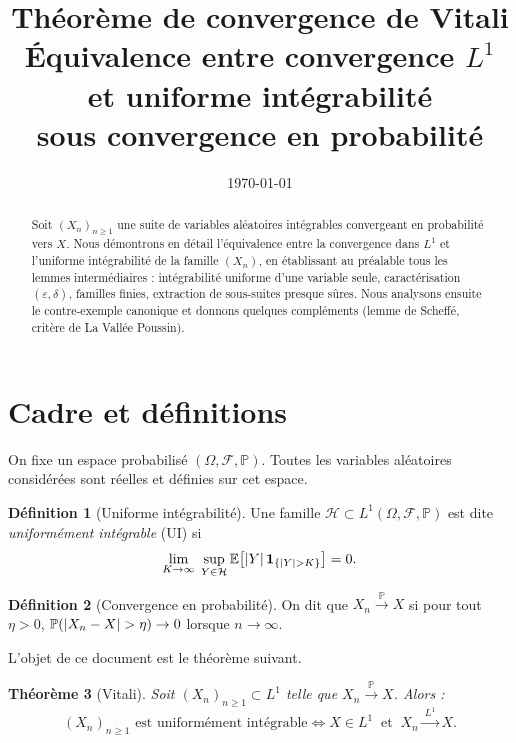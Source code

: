\documentclass[11pt,a4paper]{article}
\title{Théorème de convergence de Vitali\\[0.3em]
\large Équivalence entre convergence $L^1$ et uniforme intégrabilité\\
sous convergence en probabilité}
\author{}
\date{\today}
\newtheorem{theorem}{Théorème}[section]
\theoremstyle{definition}
\newtheorem{definition}[theorem]{Définition}
\theoremstyle{remark}
\newcommand{\E}{\mathbb{E}}
\newcommand{\PP}{\mathbb{P}}
\newcommand{\F}{\mathcal{F}}
\newcommand{\Hf}{\mathcal{H}}
\newcommand{\ind}[1]{\mathbf{1}_{#1}}
\newcommand{\convP}{\xrightarrow{\ \PP\ }}
\newcommand{\convLone}{\xrightarrow{\ L^1\ }}
\DeclarePairedDelimiter{\abs}{\lvert}{\rvert}
\begin{document}
\maketitle

\begin{abstract}
Soit $(X_n)_{n\ge 1}$ une suite de variables aléatoires intégrables convergeant en
probabilité vers $X$. Nous démontrons en détail l'équivalence entre la convergence
dans $L^1$ et l'uniforme intégrabilité de la famille $(X_n)$, en établissant au
préalable tous les lemmes intermédiaires : intégrabilité uniforme d'une variable
seule, caractérisation $(\varepsilon,\delta)$, familles finies, extraction de
sous-suites presque sûres. Nous analysons ensuite le contre-exemple canonique et
donnons quelques compléments (lemme de Scheffé, critère de La Vallée Poussin).
\end{abstract}

\tableofcontents

\section{Cadre et définitions}

On fixe un espace probabilisé $(\Omega, \F, \PP)$. Toutes les variables aléatoires
considérées sont réelles et définies sur cet espace.

\begin{definition}[Uniforme intégrabilité]\label{def:UI}
Une famille $\Hf \subset L^1(\Omega,\F,\PP)$ est dite \emph{uniformément intégrable}
(UI) si
\[
\lim_{K \to \infty} \; \sup_{Y \in \Hf} \E\big[\abs{Y}\,\ind{\{\abs{Y} > K\}}\big] = 0.
\]
\end{definition}

\begin{definition}[Convergence en probabilité]
On dit que $X_n \convP X$ si pour tout $\eta > 0$,
$\PP(\abs{X_n - X} > \eta) \to 0$ lorsque $n \to \infty$.
\end{definition}

L'objet de ce document est le théorème suivant.

\begin{theorem}[Vitali]\label{thm:vitali}
Soit $(X_n)_{n \ge 1} \subset L^1$ telle que $X_n \convP X$. Alors :
\[
(X_n)_{n\ge 1} \text{ est uniformément intégrable}
\iff
X \in L^1 \ \text{ et } \ X_n \convLone X.
\]
\end{theorem}
\end{document}
